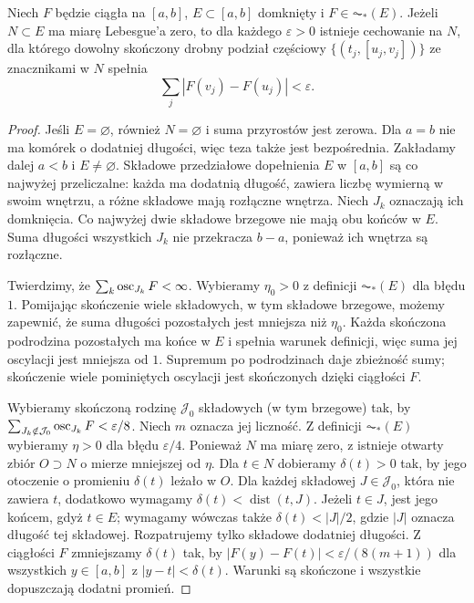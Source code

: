 \begin{lemat}
\label{ma1:kh:lem:acstar-null-variation}\label{it:lem:acstar-null-variation}
Niech $F$ będzie ciągła na $[a,b]$, $E\subset[a,b]$ domknięty i $F\in\AC_*(E)$. Jeżeli $N\subset E$ ma miarę Lebesgue'a zero, to dla każdego $\varepsilon>0$ istnieje cechowanie na $N$, dla którego dowolny skończony drobny podział częściowy $\{(t_j,[u_j,v_j])\}$ ze znacznikami w $N$ spełnia
\[
 \sum_j|F(v_j)-F(u_j)|<\varepsilon.
\]
\end{lemat}
\begin{proof}
Jeśli $E=\varnothing$, również $N=\varnothing$ i suma przyrostów jest zerowa. Dla $a=b$ nie ma komórek o dodatniej długości, więc teza także jest bezpośrednia. Zakładamy dalej $a<b$ i $E\ne\varnothing$. Składowe przedziałowe dopełnienia $E$ w $[a,b]$ są co najwyżej przeliczalne: każda ma dodatnią długość, zawiera liczbę wymierną w swoim wnętrzu, a różne składowe mają rozłączne wnętrza. Niech $J_k$ oznaczają ich domknięcia. Co najwyżej dwie składowe brzegowe nie mają obu końców w $E$. Suma długości wszystkich $J_k$ nie przekracza $b-a$, ponieważ ich wnętrza są rozłączne.

Twierdzimy, że $\sum_k\operatorname{osc}_{J_k}F<\infty$. Wybieramy $\eta_0>0$ z definicji $\AC_*(E)$ dla błędu $1$. Pomijając skończenie wiele składowych, w tym składowe brzegowe, możemy zapewnić, że suma długości pozostałych jest mniejsza niż $\eta_0$. Każda skończona podrodzina pozostałych ma końce w $E$ i spełnia warunek definicji, więc suma jej oscylacji jest mniejsza od $1$. Supremum po podrodzinach daje zbieżność sumy; skończenie wiele pominiętych oscylacji jest skończonych dzięki ciągłości $F$.

Wybieramy skończoną rodzinę $\mathcal J_0$ składowych (w tym brzegowe) tak, by $\sum_{J_k\notin\mathcal J_0}\operatorname{osc}_{J_k}F<\varepsilon/8$. Niech $m$ oznacza jej liczność. Z definicji $\AC_*(E)$ wybieramy $\eta>0$ dla błędu $\varepsilon/4$. Ponieważ $N$ ma miarę zero, z  istnieje otwarty zbiór $O\supset N$ o mierze mniejszej od $\eta$. Dla $t\in N$ dobieramy $\delta(t)>0$ tak, by jego otoczenie o promieniu $\delta(t)$ leżało w $O$. Dla każdej składowej $J\in\mathcal J_0$, która nie zawiera $t$, dodatkowo wymagamy $\delta(t)<\operatorname{dist}(t,J)$. Jeżeli $t\in J$, jest jego końcem, gdyż $t\in E$; wymagamy wówczas także $\delta(t)<|J|/2$, gdzie $|J|$ oznacza długość tej składowej. Rozpatrujemy tylko składowe dodatniej długości. Z ciągłości $F$ zmniejszamy $\delta(t)$ tak, by $|F(y)-F(t)|<\varepsilon/(8(m+1))$ dla wszystkich $y\in[a,b]$ z $|y-t|<\delta(t)$. Warunki są skończone i wszystkie dopuszczają dodatni promień.


\end{proof}
